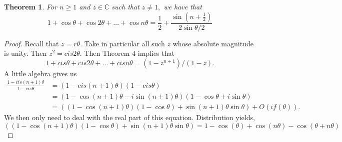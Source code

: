 \documentclass[letter]{article}
\newtheorem{theorem}{Theorem}
\newenvironment{menumerate}{%
  \edef\backupindent{\the\parindent}%
  \enumerate%
  \setlength{\parindent}{\backupindent}%
}{\endenumerate}
\begin{document}
\begin{menumerate}
        \begin{theorem}
            For $n\geq 1$ and $z \in \mathbb{C}$ such that $z \neq 1,$ we have that
            \begin{equation}
                1 +\cos \theta + \cos 2 \theta + \dots + \cos n \theta = \frac12 + \frac{\sin(n + \frac12)}{2 \sin \theta/2}
            \end{equation}
        \end{theorem}
        \begin{proof}
            Recall  that $z = r
             \theta.$ Take in particular all such $z$ whose absolute magnitude is unity. Then $z^2 = cis 2\theta.$ 
            Then Theorem $4$ implies that 
            \begin{equation}
                1 + cis \theta + cis 2 \theta + \dots + cis n \theta = (1-z^{n+1})/(1-z).
            \end{equation}
            A little algebra gives us 
            \begin{equation}
                \begin{aligned}
                    \frac{1 - cis (n+1)\theta}{1 - cis \theta} &= (1 - cis (n+1) \theta)\overline{(1 - cis \theta)} \\
                    &= (1 - \cos(n+1)\theta - i\sin(n+1)\theta)(1 - \cos\theta + i\sin\theta) \\
                    &= ((1 - \cos(n+1)\theta)(1 - \cos\theta) +  \sin(n+1)\theta\sin \theta) + O(if(\theta)).
                \end{aligned}
            \end{equation}
            We then only need to deal with the real part of this equation. Distribution yields, 
            \begin{equation}
            ((1 - \cos(n+1)\theta)(1 - \cos\theta) +  \sin(n+1)\theta\sin \theta) = 1-\cos(\theta)+\cos(n\theta)-\cos(\theta+n\theta)
            \end{equation}
        \end{proof}
\end{menumerate}
\end{document}
